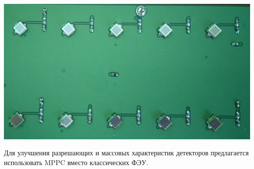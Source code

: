 \documentclass[a1paper,portrait, fontscale=0.575]{baposter}
\begin{document}
\begin{poster}
{            \begin{center}
                \includegraphics[width=0.85\linewidth]{electronics.png}
                \label{electronic}
            \end{center}
            Для улучшения разрешающих и массовых характеристик детекторов предлагается использовать MPPC вместо классических ФЭУ.
        }
        
        
        

\end{poster}
\end{document}
